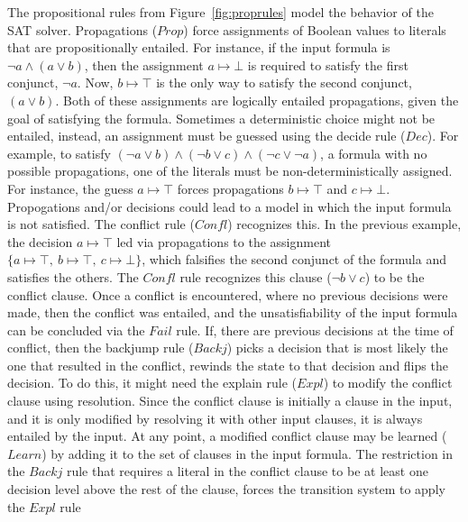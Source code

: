 \documentclass[11pt]{article}
\begin{document}
	The propositional rules from
	Figure~\ref{fig:proprules}
	model the behavior of the SAT solver.
	Propagations ($\mathit{Prop}$) force 
	assignments of Boolean values to literals 
	that are propositionally entailed. 
	For instance, if the input 
	formula is $\neg a \land (a \lor b)$, 
	then the assignment $a \mapsto \bot$ is 
	required to satisfy the first conjunct,
	$\neg a$. Now, $b \mapsto \top$ is the only 
	way to satisfy the second conjunct, 
	$(a \lor b)$. Both of these assignments 
	are logically entailed propagations, 
	given the goal of satisfying the formula. 
	Sometimes a deterministic choice 
	might not be entailed, instead, 
	an assignment must be guessed 
	using the decide rule ($\mathit{Dec}$). For 
	example, to 
	satisfy $(\neg a \lor b) \land 
	(\neg b \lor c) \land (\neg c \lor 
	\neg a)$, a formula 
	with no possible propagations, 
	one of the literals must be 
	non-deterministically assigned.
	For instance, the guess $a \mapsto \top$
	forces propagations $b \mapsto \top$ and 
	$c \mapsto \bot$. Propogations and/or 
	decisions could lead to a model in 
	which the input formula is not satisfied.
	The conflict rule ($\mathit{Confl}$) recognizes 
	this. In the previous example, the 
	decision $a \mapsto \top$ led via 
	propagations to the assignment
	$\{a \mapsto \top,\ b \mapsto \top,\ 
	c \mapsto \bot\}$, which falsifies 
	the second conjunct of the formula 
	and satisfies the others. The 
	$\mathit{Confl}$ rule recognizes this 
	clause ($\neg b \lor c$) to be the 
	conflict clause. Once a conflict is 
	encountered, where no previous 
	decisions were made, then the 
	conflict was entailed, and the 
	unsatisfiability of the input formula
	can be concluded via the $\mathit{Fail}$ rule. 
	If, there are previous decisions at
	the time of conflict, then the backjump
	rule ($\mathit{Backj}$) picks a decision that is 
	most likely the one that resulted in 
	the conflict, rewinds the state to 
	that decision and flips the decision. 
	To do this, it might need the explain 
	rule ($\mathit{Expl}$) to modify the 
	conflict clause using resolution. 
	Since the conflict clause is initially 
	a clause in the input, and it is only 
	modified by resolving it with other 
	input clauses, it is always entailed 
	by the input. At any point, a modified 
	conflict clause may be learned 
	($\mathit{Learn}$) by adding it to the 
	set of clauses in the input formula. 
	The restriction in the $\mathit{Backj}$ rule 
	that requires a literal in the 
	conflict clause to be at least 
	one decision level above the rest of 
	the clause, forces the transition 
	system to apply the $\mathit{Expl}$ rule 
\end{document}
